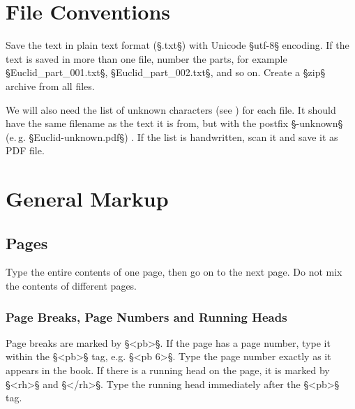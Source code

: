 



\section{File Conventions}
\label{section file conventions}

\begin{mainruleLessImportant}
Save the text in plain text format (§.txt§) with Unicode §utf-8§ encoding. If the text is saved in more than one file, number the parts, for example §Euclid_part_001.txt§, §Euclid_part_002.txt§, and so on. Create a §zip§ archive from all files.

We will also need the list of unknown characters (see ) for each file. It should have the same filename
as the text it is from, but with the postfix §-unknown§ (e.\,g.
§Euclid-unknown.pdf§) . If the list is handwritten, scan it and save it as PDF file.
\end{mainruleLessImportant}


\section{General Markup}

\tocspace
\subsection{Pages}

\begin{mainrule}
Type the entire contents of one page, then go on to the next page. Do not mix the contents of different pages.
\end{mainrule}

\subsubsection{Page Breaks, Page Numbers and Running Heads}
\label{section page breaks}

\begin{mainrule}
Page breaks are marked by §<pb>§. If the page has a page number, type it within the §<pb>§ tag, e.g. §<pb 6>§. Type the page number exactly as it appears in the book. If there is a running head on the page, it is marked by §<rh>§ and §</rh>§. Type the running head immediately after the §<pb>§ tag. 
\end{mainrule}

